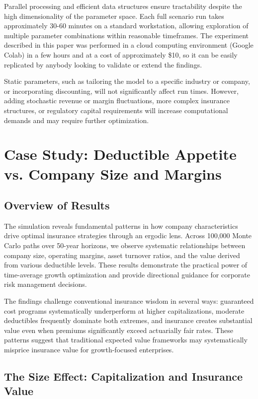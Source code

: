 \documentclass[11pt,letterpaper]{article}
\begin{document}
Parallel processing and efficient data structures ensure tractability despite the high dimensionality of the parameter space. Each full scenario run takes approximately 30-60 minutes on a standard workstation, allowing exploration of multiple parameter combinations within reasonable timeframes. The experiment described in this paper was performed in a cloud computing environment (Google Colab) in a few hours and at a cost of approximately \$10, so it can be easily replicated by anybody looking to validate or extend the findings.

Static parameters, such as tailoring the model to a specific industry or company, or incorporating discounting, will not significantly affect run times. However, adding stochastic revenue or margin fluctuations, more complex insurance structures, or regulatory capital requirements will increase computational demands and may require further optimization.
\section{Case Study: Deductible Appetite vs. Company Size and Margins}

\subsection{Overview of Results}

The simulation reveals fundamental patterns in how company characteristics drive optimal insurance strategies through an ergodic lens. Across 100,000 Monte Carlo paths over 50-year horizons, we observe systematic relationships between company size, operating margins, asset turnover ratios, and the value derived from various deductible levels. These results demonstrate the practical power of time-average growth optimization and provide directional guidance for corporate risk management decisions.

The findings challenge conventional insurance wisdom in several ways: guaranteed cost programs systematically underperform at higher capitalizations, moderate deductibles frequently dominate both extremes, and insurance creates substantial value even when premiums significantly exceed actuarially fair rates. These patterns suggest that traditional expected value frameworks may systematically misprice insurance value for growth-focused enterprises.

\subsection{The Size Effect: Capitalization and Insurance Value}
\end{document}
